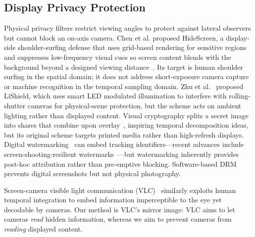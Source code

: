 \documentclass{ieeeaccess}
\begin{document}
\subsection{Display Privacy Protection}

Physical privacy filters restrict viewing angles to protect against lateral observers but cannot block an on-axis camera. Chen et al. proposed HideScreen, a display-side shoulder-surfing defense that uses grid-based rendering for sensitive regions and suppresses low-frequency visual cues so screen content blends with the background beyond a designed viewing distance~\cite{b_hidescreen2019}. Its target is human shoulder surfing in the spatial domain; it does not address short-exposure camera capture or machine recognition in the temporal sampling domain. Zhu et al.~\cite{b_zhu2017} proposed LiShield, which uses smart LED modulated illumination to interfere with rolling-shutter cameras for physical-scene protection, but the scheme acts on ambient lighting rather than displayed content. Visual cryptography splits a secret image into shares that combine upon overlay~\cite{b_naor1994}, inspiring temporal decomposition ideas, but its original scheme targets printed media rather than high-refresh displays. Digital watermarking~\cite{b_zhong2023} can embed tracking identifiers---recent advances include screen-shooting-resilient watermarks~\cite{b_fang2019}---but watermarking inherently provides post-hoc attribution rather than pre-emptive blocking. Software-based DRM prevents digital screenshots but not physical photography.

Screen-camera visible light communication (VLC)~\cite{b_nguyen2016,b_tran2021,b_ghiasi2024} similarly exploits human temporal integration to embed information imperceptible to the eye yet decodable by cameras. Our method is VLC's mirror image: VLC aims to let cameras \emph{read} hidden information, whereas we aim to prevent cameras from \emph{reading} displayed content.
\end{document}
